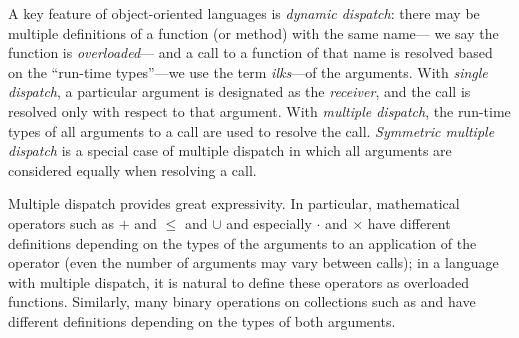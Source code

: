A key feature of object-oriented languages is \emph{dynamic dispatch}: 
there may be multiple definitions of a function (or method) with the same name---%
we say the function is \emph{overloaded}---%
and a call to a function of that name is resolved
based on the ``run-time types''---we use the term \emph{ilks}---of the arguments. 
With \emph{single dispatch}, 
a particular argument is designated as the \emph{receiver}, 
and the call is resolved only with respect to that argument.
With \emph{multiple dispatch}, 
the run-time types of  all arguments to a call are used to resolve the call.
\emph{Symmetric multiple dispatch} is a special case of multiple dispatch 
in which all arguments are considered equally when resolving a call.

Multiple dispatch provides great expressivity.
In particular, 
mathematical operators such as $+$ and $\leq$ and $\cup$
and especially $\cdot$ and $\times$
have different definitions depending on the types of the arguments
to an application of the operator
(even the number of arguments may vary between calls); 
in a language with multiple dispatch, 
it is natural to define these operators as overloaded functions. 
Similarly, 
many binary operations on collections such as  and  
have different definitions 
depending on the types of both arguments. 



